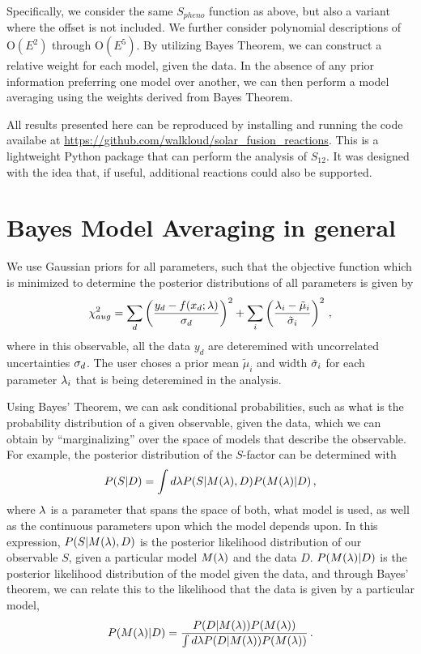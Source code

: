 \documentclass[prd,10pt,superscriptaddress,notitlepage,tightenlines,nofootinbib,floatfix]{revtex4-1}
\begin{document}
Specifically, we consider the same $S_{pheno}$ function as above, but also a variant where the offset is not included.  We further consider polynomial descriptions of $\mathrm{O}(E^2)$ through $\mathrm{O}(E^5)$.
By utilizing Bayes Theorem, we can construct a relative weight for each model, given the data.  In the absence of any prior information preferring one model over another, we can then perform a model averaging using the weights derived from Bayes Theorem.

All results presented here can be reproduced by installing and running the code availabe at \url{https://github.com/walkloud/solar_fusion_reactions}.
This is a lightweight Python package that can perform the analysis of $S_{12}$.  It was designed with the idea that, if useful, additional reactions could also be supported.


\section{Bayes Model Averaging in general \label{sec:bma}}

We use Gaussian priors for all parameters, such that the objective function which is minimized to determine the posterior distributions of all parameters is given by
\begin{equation}
\chi^2_{aug} = \sum_d \left( \frac{y_d - f(x_d;{\lambda})}{{\sigma}_d}\right)^2 
    + \sum_i \left( \frac{{\lambda}_i - \tilde{\mu}_i}{\tilde{{\sigma}}_i} \right)^2\, ,
\end{equation}
where in this observable, all the data $y_d$ are deteremined with uncorrelated uncertainties ${\sigma}_d$.
The user choses a prior mean $\tilde{\mu}_i$ and width $\tilde{{\sigma}}_i$ for each parameter ${\lambda}_i$ that is being deteremined in the analysis.





Using Bayes' Theorem, we can ask conditional probabilities, such as what is the probability distribution of a given observable, given the data, which we can obtain by ``marginalizing'' over the space of models that describe the observable.  For example, the posterior distribution of the $S$-factor can be determined with 
\begin{equation}
P(S | D) = \int d{\lambda} P(S | M({\lambda}), D) P(M({\lambda}) | D)\, ,
\end{equation}
where ${\lambda}$ is a parameter that spans the space of both, what model is used, as well as the continuous parameters upon which the model depends upon.
In this expression, $P(S | M({\lambda}), D)$ is the posterior likelihood distribution of our observable $S$, given a particular model $M({\lambda})$ and the data $D$.
$P(M({\lambda}) | D)$ is the posterior likelihood distribution of the model given the data, and through Bayes' theorem, we can relate this to the likelihood that the data is given by a particular model, 
\begin{equation}
P(M({\lambda})|D) = \frac{P(D|M({\lambda})) P(M({\lambda}))}{\int d{\lambda} P(D|M({\lambda}))P(M({\lambda}))}\, .
\end{equation}
\end{document}
